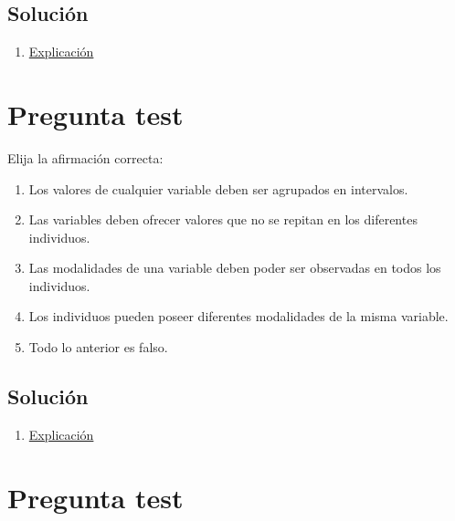 \documentclass[
]{book}
\providecommand{\tightlist}{%
  \setlength{\itemsep}{0pt}\setlength{\parskip}{0pt}}
\begin{document}
\hypertarget{soluciuxf3n-6}{%
\subsection{Solución}\label{soluciuxf3n-6}}

\begin{enumerate}
\def\labelenumi{\alph{enumi})}
\setcounter{enumi}{2}
\tightlist
\item
  \href{https://1fjmanzano.github.io/bioestadistica/me\%CC\%81todos-de-muestreo.html}{Explicación}
\end{enumerate}

\hypertarget{pregunta-test-7}{%
\section{Pregunta test}\label{pregunta-test-7}}

Elija la afirmación correcta:

\begin{enumerate}
\def\labelenumi{\alph{enumi})}
\tightlist
\item
  Los valores de cualquier variable deben ser agrupados en intervalos.
\item
  Las variables deben ofrecer valores que no se repitan en los diferentes individuos.
\item
  Las modalidades de una variable deben poder ser observadas en todos los individuos.
\item
  Los individuos pueden poseer diferentes modalidades de la misma variable.
\item
  Todo lo anterior es falso.
\end{enumerate}

\hypertarget{soluciuxf3n-7}{%
\subsection{Solución}\label{soluciuxf3n-7}}

\begin{enumerate}
\def\labelenumi{\alph{enumi})}
\setcounter{enumi}{2}
\tightlist
\item
  \href{https://1fjmanzano.github.io/bioestadistica/tipos-de-variables.html}{Explicación}
\end{enumerate}

\hypertarget{pregunta-test-8}{%
\section{Pregunta test}\label{pregunta-test-8}}
\end{document}

